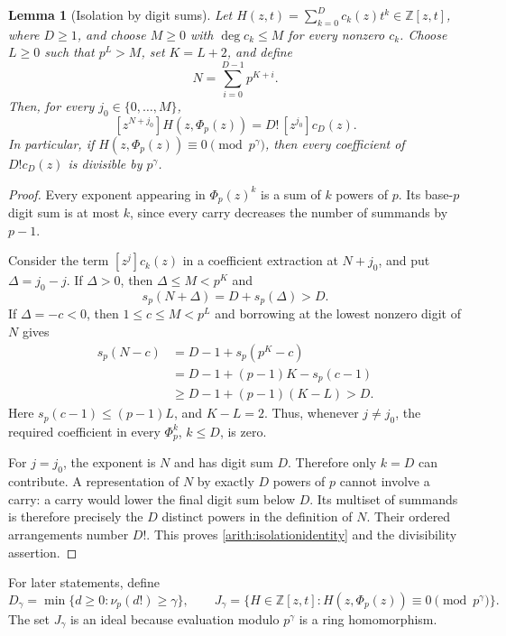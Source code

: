 \documentclass[11pt,a4paper]{article}
\newtheorem{lemma}{Lemma}[section]
\theoremstyle{definition}
\theoremstyle{remark}\newtheorem{remark}[lemma]{Remark}
\begin{document}
\begin{lemma}[Isolation by digit sums]\label{arith:isolate}
Let $H(z,t)=\sum_{k=0}^{D}c_k(z)t^k\in\mathbb Z[z,t]$, where $D\geq1$,
and choose $M\geq0$ with $\deg c_k\leq M$ for every nonzero $c_k$.
Choose $L\geq0$ such that $p^L>M$, set $K=L+2$, and define
\[
 N=\sum_{i=0}^{D-1}p^{K+i}.
\]
Then, for every $j_0\in\{0,\ldots,M\}$,
\begin{equation}\label{arith:isolationidentity}
 [z^{N+j_0}]H(z,\Phi_p(z))=D!\,[z^{j_0}]c_D(z).
\end{equation}
In particular, if $H(z,\Phi_p(z))\equiv0\pmod{p^\gamma}$, then every
coefficient of $D!c_D(z)$ is divisible by $p^\gamma$.
\end{lemma}
\begin{proof}
Every exponent appearing in $\Phi_p(z)^k$ is a sum of $k$ powers of $p$.
Its base-$p$ digit sum is at most $k$, since every carry decreases the
number of summands by $p-1$.

Consider the term $[z^j]c_k(z)$ in a coefficient extraction at $N+j_0$,
and put $\Delta=j_0-j$. If $\Delta>0$, then $\Delta\leq M<p^K$ and
\[
 s_p(N+\Delta)=D+s_p(\Delta)>D.
\]
If $\Delta=-c<0$, then $1\leq c\leq M<p^L$ and borrowing at the
lowest nonzero digit of $N$ gives
\begin{align*}
 s_p(N-c)
   &=D-1+s_p(p^K-c)\\
   &=D-1+(p-1)K-s_p(c-1)\\
   &\geq D-1+(p-1)(K-L)>D.
\end{align*}
Here $s_p(c-1)\leq(p-1)L$, and $K-L=2$. Thus, whenever $j\ne j_0$,
the required coefficient in every $\Phi_p^k$, $k\leq D$, is zero.

For $j=j_0$, the exponent is $N$ and has digit sum $D$. Therefore only
$k=D$ can contribute. A representation of $N$ by exactly $D$ powers of
$p$ cannot involve a carry: a carry would lower the final digit sum below
$D$. Its multiset of summands is therefore precisely the $D$ distinct
powers in the definition of $N$. Their ordered arrangements number $D!$.
This proves \eqref{arith:isolationidentity} and the divisibility assertion.
\end{proof}

For later statements, define
\[
 D_\gamma=\min\{d\geq0:\nu_p(d!)\geq\gamma\},\qquad
 J_\gamma=\{H\in\mathbb Z[z,t]:H(z,\Phi_p(z))\equiv0\pmod{p^\gamma}\}.
\]
The set $J_\gamma$ is an ideal because evaluation modulo $p^\gamma$ is
a ring homomorphism.
\end{document}

